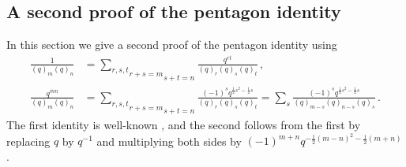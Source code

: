 \documentclass[12pt]{amsart}
\theoremstyle{definition}
\newcommand{\ha}{\frac12}
\numberwithin{equation}{section}
\begin{document}
\subsection{A second proof of the pentagon identity}
\label{sub.secondpentagon}

In this section we give a second proof of the pentagon identity
using
\begin{equation} 
\label{eq.5qa}
\begin{split}
\frac1{(q)_m (q)_n} &=\underset{s+t=n}{\underset{r+s=m}{\sum_{r,s,t}}} 
\frac{q^{rt}}{(q)_r(q)_s(q)_t}\, ,\\
\frac{q^{mn}}{(q)_m (q)_n} &=\underset{s+t=n}{\underset{r+s=m}{\sum_{r,s,t}}} 
\frac{(-1)^s q^{\ha s^2-\ha s}}{(q)_r(q)_s(q)_t}= 
\sum_s \frac{(-1)^s q^{\ha s^2-\ha s}}{(q)_{m-s}(q)_{n-s}(q)_s}\, .
\end{split}
\end{equation}
The first identity is well-known \cite[Eqn.(13)]{Zagier-dilog}, 
and the second follows from 
the first by replacing $q$ by $q^{-1}$ and multiplying both sides by 
$(-1)^{m+n} q^{-\ha (m-n)^2 -\ha(m+n)}$. 
\end{document}
